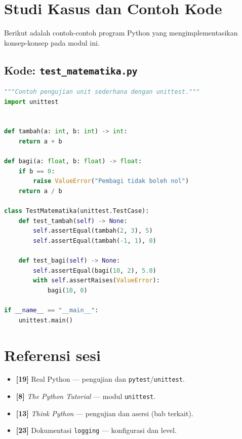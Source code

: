 \documentclass[../main.tex]{subfiles}
\begin{document}
\section{Studi Kasus dan Contoh Kode}

Berikut adalah contoh-contoh program Python yang mengimplementasikan konsep-konsep pada modul ini.

\subsection{Kode: \texttt{test\_matematika.py}}
\introstudikasuskode
\begin{lstlisting}[language=Python,caption={\texttt{test\_matematika.py}}]
"""Contoh pengujian unit sederhana dengan unittest."""
import unittest


def tambah(a: int, b: int) -> int:
    return a + b

def bagi(a: float, b: float) -> float:
    if b == 0:
        raise ValueError("Pembagi tidak boleh nol")
    return a / b

class TestMatematika(unittest.TestCase):
    def test_tambah(self) -> None:
        self.assertEqual(tambah(2, 3), 5)
        self.assertEqual(tambah(-1, 1), 0)

    def test_bagi(self) -> None:
        self.assertEqual(bagi(10, 2), 5.0)
        with self.assertRaises(ValueError):
            bagi(10, 0)

if __name__ == "__main__":
    unittest.main()
\end{lstlisting}

\section{Referensi sesi}

\begin{itemize}[leftmargin=*]
  \item \textbf{[19]} Real Python --- pengujian dan \texttt{pytest}/\texttt{unittest}.
  \item \textbf{[8]} \textit{The Python Tutorial} --- modul \texttt{unittest}.
  \item \textbf{[13]} \textit{Think Python} --- pengujian dan asersi (bab terkait).
  \item \textbf{[23]} Dokumentasi \texttt{logging} --- konfigurasi dan level.
\end{itemize}
\end{document}
